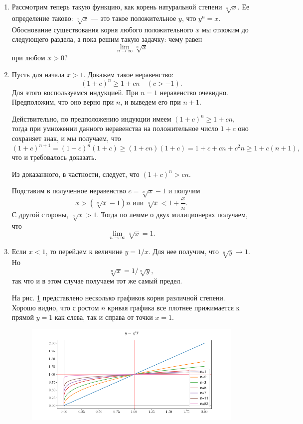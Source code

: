 \begin{enumerate}


\item Рассмотрим теперь такую функцию, как корень натуральной степени $\sqrt[n]{x}$. Ее определение таково: $\sqrt[n]{x}$ --- это такое положительное $y$, что $y^n=x$. Обоснование существования корня любого положительного $x$ мы отложим до следующего раздела, а пока решим такую задачку: чему равен 
$$
\lim_{n\to \infty}\sqrt[n]{x}
$$
при любом $x>0$?
\item Пусть для начала $x>1$. Докажем такое неравенство:
$$
(1+c)^n\ge 1+cn\quad(c>-1).
$$
Для этого воспользуемся индукцией. При $n=1$ неравенство очевидно. Предположим, что оно верно при $n$, и выведем его при $n+1$.

Действительно, по предположению индукции имеем $(1+c)^n\ge 1+cn$, тогда при умножении данного неравенства на положительное число $1+c$ оно сохраняет знак, и мы получаем, что
$$
(1+c)^{n+1}=(1+c)^n(1+c)\ge (1+cn)(1+c)=1+c+cn+c^2n\ge 1+c(n+1),
$$
что и требовалось доказать.

Из доказанного, в частности, следует, что $(1+c)^n>cn$. 

Подставим в полученное неравенство $c=\sqrt[n]{x}-1$ и получим
$$
x>(\sqrt[n]{x}-1)n\mbox{ или }\sqrt[n]{x}<1+\frac xn.
$$
С другой стороны, $\sqrt[n]{x}>1$. Тогда по лемме о двух милиционерах получаем, что
$$
\lim_{n\to \infty}\sqrt[n]{x}=1.
$$

\item Если $x<1$, то перейдем к величине $y=1/x$. Для нее получим, что $\sqrt[n]{y}\to 1$. Но
$$
\sqrt[n]{x}=1/\sqrt[n]{y},
$$
так что и в этом случае получаем тот же самый предел.

На рис. \ref{root} представлено несколько графиков корня различной степени. Хорошо видно, что с ростом $n$ кривая графика все плотнее прижимается к прямой $y=1$ как слева, так и справа от точки $x=1$.
\begin{figure}[hbt!]
\begin{center}
\includegraphics[scale=0.5]{root.png}
\end{center}\caption{}\label{root}
\end{figure}




\end{enumerate}
